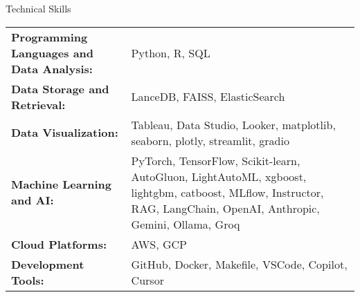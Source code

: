 \documentclass{resume} %
\begin{document}
\begin{rSection}{Technical Skills}
    \begin{tabular}{ @{} >{\bfseries}l @{\hspace{1ex}} l }
                    Programming Languages and Data Analysis: & Python, R, SQL \\
                    Data Storage and Retrieval: & LanceDB, FAISS, ElasticSearch \\
                    Data Visualization: & Tableau, Data Studio, Looker, matplotlib, seaborn, plotly, streamlit, gradio \\
                    Machine Learning and AI: & PyTorch, TensorFlow, Scikit-learn, AutoGluon, LightAutoML, xgboost, lightgbm, catboost, MLflow, Instructor, RAG, LangChain, OpenAI, Anthropic, Gemini, Ollama, Groq \\
                    Cloud Platforms: & AWS, GCP \\
                    Development Tools: & GitHub, Docker, Makefile, VSCode, Copilot, Cursor \\
            \end{tabular}
\end{rSection}
\end{document}
